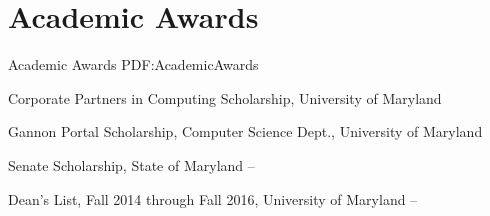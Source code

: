 
\section
{Academic Awards}
{Academic Awards}
{PDF:AcademicAwards}

\BulletItem
Corporate Partners in Computing Scholarship,
University of Maryland
\hfill
{}

\GapNoBreak
\BulletItem
Gannon Portal Scholarship,
Computer Science Dept., 
University of Maryland
\hfill
{}

\GapNoBreak
\BulletItem
Senate Scholarship,
State of Maryland
\hfill
{} --

\GapNoBreak
\BulletItem
Dean's List,
Fall 2014 through Fall 2016,
University of Maryland
\hfill
{} --
\Gap
